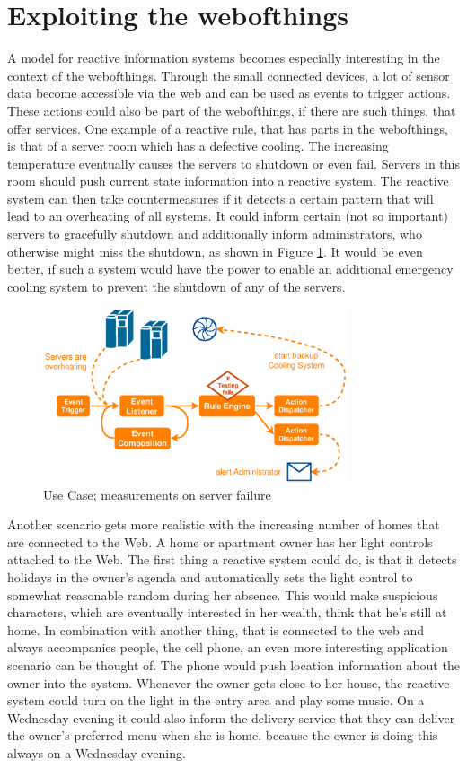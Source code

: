 \section{Exploiting the \gls{webofthings}}
A model for reactive information systems becomes especially interesting in the context of the \textrm{\gls{webofthings}}. 
Through the small connected devices, a lot of sensor data become accessible via the \textrm{\gls{web}} and can be used as events to trigger actions.
These actions could also be part of the \textrm{\gls{webofthings}}, if there are such things, that offer services.
One example of a reactive rule, that has parts in the \textrm{\gls{webofthings}}, is that of a server room which has a defective cooling.
The increasing temperature eventually causes the servers to shutdown or even fail.
Servers in this room should push current state information into a reactive system.
The reactive system can then take countermeasures if it detects a certain pattern that will lead to an overheating of all systems.
It could inform certain (not so important) servers to gracefully shutdown and additionally inform administrators, who otherwise might miss the shutdown, as shown in Figure \ref{fig:WoT_Server}.
It would be even better, if such a system would have the power to enable an additional emergency cooling system to prevent the shutdown of any of the servers.
\begin{figure}[!ht]
  \centering
  \includegraphics[width=0.8\textwidth]{figures/WoT_Server}
  \caption{Use Case; measurements on server failure}
  \label{fig:WoT_Server}
\end{figure}

Another scenario gets more realistic with the increasing number of homes that are connected to the Web.
A home or apartment owner has her light controls attached to the Web.
The first thing a reactive system could do, is that it detects holidays in the owner's agenda and automatically sets the light control to somewhat reasonable random during her absence.
This would make suspicious characters, which are eventually interested in her wealth, think that he's still at home.
In combination with another thing, that is connected to the \textrm{\gls{web}} and always accompanies people, the cell phone, an even more interesting application scenario can be thought of.
The phone would push location information about the owner into the system.
Whenever the owner gets close to her house, the reactive system could turn on the light in the entry area and play some music.
On a Wednesday evening it could also inform the delivery service that they can deliver the owner's preferred menu when she is home, because the owner is doing this always on a Wednesday evening.

